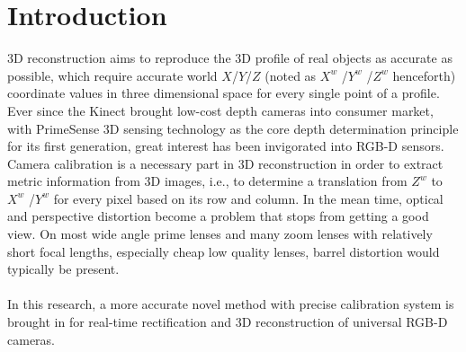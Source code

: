 \label{sens_introduction} %
\chapter{Introduction} %
3D reconstruction aims to reproduce the 3D profile of real objects as accurate as possible, which require accurate world \(X\)/\(Y\)/\(Z\) (noted as \(X^{w}\) /\(Y^{w}\) /\(Z^{w}\)  henceforth) coordinate values in three dimensional space for every single point of a profile. Ever since the Kinect brought low-cost depth cameras into consumer market, with PrimeSense 3D sensing technology as the core depth determination principle for its first generation, great interest has been invigorated into RGB-D sensors. Camera calibration is a necessary part in 3D reconstruction in order to extract metric information from 3D images, i.e., to determine a translation from \(Z^{w}\)  to \(X^{w}\) /\(Y^{w}\)  for every pixel based on its row and column. In the mean time, optical and perspective distortion become a problem that stops from getting a good view. On most wide angle prime lenses and many zoom lenses with relatively short focal lengths,  especially cheap low quality lenses, barrel distortion would typically be present.
\\
\\In this research, a more accurate novel method with precise calibration system is brought in for real-time rectification and 3D reconstruction of universal RGB-D cameras. 
